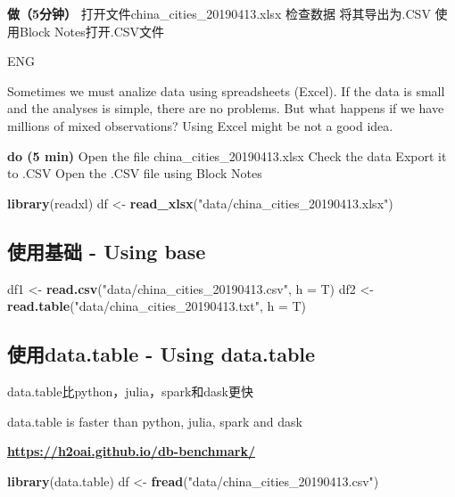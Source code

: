 \documentclass[]{book}
\newenvironment{Shaded}{\begin{snugshade}}{\end{snugshade}}
\newcommand{\DataTypeTok}[1]{\textcolor[rgb]{0.13,0.29,0.53}{#1}}
\newcommand{\KeywordTok}[1]{\textcolor[rgb]{0.13,0.29,0.53}{\textbf{#1}}}
\newcommand{\NormalTok}[1]{#1}
\newcommand{\StringTok}[1]{\textcolor[rgb]{0.31,0.60,0.02}{#1}}
\begin{document}
\textbf{做（5分钟）}
打开文件china\_cities\_20190413.xlsx
检查数据
将其导出为.CSV
使用Block Notes打开.CSV文件

ENG

Sometimes we must analize data using spreadsheets (Excel). If the data is small and the analyses is simple, there are no problems. But what
happens if we have millions of mixed observations? Using Excel might be not a good idea.

\textbf{do (5 min)}
Open the file china\_cities\_20190413.xlsx
Check the data
Export it to .CSV
Open the .CSV file using Block Notes

\begin{Shaded}
\begin{Highlighting}[]
\KeywordTok{library}\NormalTok{(readxl)}
\NormalTok{df <-}\StringTok{ }\KeywordTok{read_xlsx}\NormalTok{(}\StringTok{"data/china_cities_20190413.xlsx"}\NormalTok{)}
\end{Highlighting}
\end{Shaded}

\hypertarget{using-base}{%
\subsection{使用基础 - Using base}\label{using-base}}

\begin{Shaded}
\begin{Highlighting}[]
\NormalTok{df1 <-}\StringTok{ }\KeywordTok{read.csv}\NormalTok{(}\StringTok{"data/china_cities_20190413.csv"}\NormalTok{, }\DataTypeTok{h =}\NormalTok{ T)}
\NormalTok{df2 <-}\StringTok{ }\KeywordTok{read.table}\NormalTok{(}\StringTok{"data/china_cities_20190413.txt"}\NormalTok{, }\DataTypeTok{h =}\NormalTok{ T)}
\end{Highlighting}
\end{Shaded}

\hypertarget{data.table---using-data.table}{%
\subsection{使用data.table - Using data.table}\label{data.table---using-data.table}}

data.table比python，julia，spark和dask更快

data.table is faster than python, julia, spark and dask

\textbf{\url{https://h2oai.github.io/db-benchmark/}}

\begin{Shaded}
\begin{Highlighting}[]
\KeywordTok{library}\NormalTok{(data.table)}
\NormalTok{df <-}\StringTok{ }\KeywordTok{fread}\NormalTok{(}\StringTok{"data/china_cities_20190413.csv"}\NormalTok{)}
\end{Highlighting}
\end{Shaded}
\end{document}
